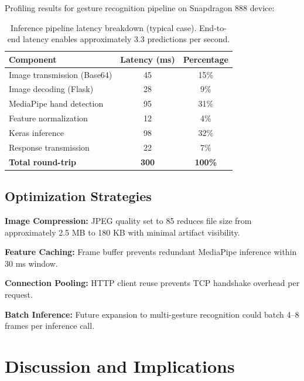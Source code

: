 \documentclass[11pt,a4paper,twoside]{report}
\begin{document}
Profiling results for gesture recognition pipeline on Snapdragon 888 device:

\begin{table}[H]
\centering
\caption{Inference pipeline latency breakdown (typical case). End-to-end latency enables approximately 3.3 predictions per second.}
\label{tab:latency-breakdown}
\begin{tabular}{|l|c|c|}
\hline
\textbf{Component} & \textbf{Latency (ms)} & \textbf{Percentage} \\
\hline
Image transmission (Base64) & 45 & 15\% \\
\hline
Image decoding (Flask) & 28 & 9\% \\
\hline
MediaPipe hand detection & 95 & 31\% \\
\hline
Feature normalization & 12 & 4\% \\
\hline
Keras inference & 98 & 32\% \\
\hline
Response transmission & 22 & 7\% \\
\hline
\textbf{Total round-trip} & \textbf{300} & \textbf{100\%} \\
\hline
\end{tabular}
\end{table}

\subsection{Optimization Strategies}
\label{subsec:optimization-strategies}

\textbf{Image Compression:} JPEG quality set to 85 reduces file size from approximately 2.5 MB to 180 KB with minimal artifact visibility.

\textbf{Feature Caching:} Frame buffer prevents redundant MediaPipe inference within 30 ms window.

\textbf{Connection Pooling:} HTTP client reuse prevents TCP handshake overhead per request.

\textbf{Batch Inference:} Future expansion to multi-gesture recognition could batch 4--8 frames per inference call.

\newpage

\section{Discussion and Implications}
\label{sec:discussion}
\end{document}
